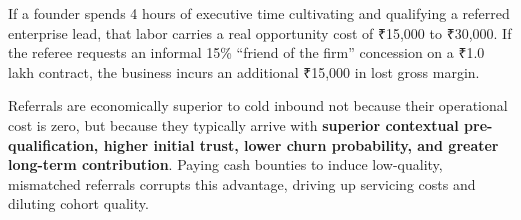 If a founder spends 4 hours of executive time cultivating and qualifying a referred enterprise lead, that labor carries a real opportunity cost of ₹15,000 to ₹30,000. If the referee requests an informal 15\% ``friend of the firm'' concession on a ₹1.0 lakh contract, the business incurs an additional ₹15,000 in lost gross margin.

Referrals are economically superior to cold inbound not because their operational cost is zero, but because they typically arrive with \textbf{superior contextual pre-qualification, higher initial trust, lower churn probability, and greater long-term contribution}. Paying cash bounties to induce low-quality, mismatched referrals corrupts this advantage, driving up servicing costs and diluting cohort quality.
